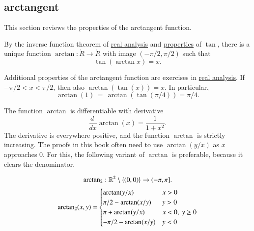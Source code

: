 \subsection{arctangent}

This section reviews the properties of the arctangent function.  

\begin{definition}[arctangent]\label{def:arctan}
By the inverse function theorem of \hyperref[back:analysis]{real analysis} and
\hyperref[lemma:tan-monotone]{properties} of $\tan$, 
there is a unique function $\arctan:\ring{R}\to\ring{R}$ with
image $(-\pi/2,\pi/2)$ such that
    \begin{displaymath}\tan(\arctan x) =x.\end{displaymath}
%
\end{definition}

Additional properties of the arctangent function are exercises in \hyperref[back:analysis]{real analysis}.
If $-\pi/2 < x < \pi/2$, then also $\arctan(\tan(x)) = x$. In
particular,
    \begin{equation}
   \arctan(1) \hyperref[lemma:tan-pi4]{\,=\,} \arctan(\tan(\pi/4)) = \pi/4.
   \end{equation}


The function $\arctan$ is differentiable with derivative%
    \begin{displaymath}\frac{d\phantom{~}} {dx} \arctan(x) = \frac{1}{1 + x^2}.\end{displaymath}
The derivative is everywhere positive, and the function $\arctan$ is
strictly increasing.
%
The proofs in this book often need to use $\arctan(y/x)$ as  $x$ approaches $0$.
For this, the following variant of $\arctan$ is preferable, because it clears the denominator.


\begin{definition}[$\atn$]\label{def:atn}
\begin{displaymath}
{\operatorname{arctan\ensuremath{_2}}}: \mathbb{R}^2\setminus\{(0,0)\} \to (-\pi,\pi].
\end{displaymath}
\begin{displaymath}
{\operatorname{arctan\ensuremath{_2}}}(x,y) = \begin{cases}
   \arctan(y/x) & x > 0\\
   \pi/2- \arctan(x/y) & y > 0 \\
   \pi + \arctan(y/x) & x< 0,\  y\ge 0\\
   -\pi/2- \arctan(x/y) & y< 0 \\
\end{cases}
\end{displaymath}
\end{definition}
%
%


